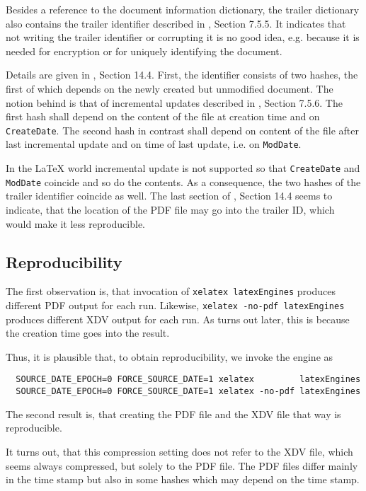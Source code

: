\documentclass[a4paper, english]{article}%
\begin{document}
Besides a reference to the document information dictionary, 
the trailer dictionary also contains the trailer identifier 
described in \cite{Pdf20}, Section 7.5.5. 
It indicates that not writing the trailer identifier or corrupting it is no good idea, 
e.g. because it is needed for encryption or for uniquely identifying the document. 

Details are given in \cite{Pdf20}, Section 14.4. 
First, the identifier consists of two hashes, 
the first of which depends on the newly created but unmodified document. 
The notion behind is that of incremental updates described in \cite{Pdf20}, Section 7.5.6. 
The first hash shall depend on the content of the file 
at creation time and on \texttt{CreateDate}. 
The second hash in contrast shall depend on content of the file after last incremental update 
and on time of last update, i.e. on \texttt{ModDate}. 

In the \LaTeX{} world incremental update is not supported 
so that \texttt{CreateDate} and \texttt{ModDate} coincide 
and so do the contents. 
As a consequence, the two hashes of the trailer identifier coincide as well. 
The last section of \cite{Pdf20}, Section 14.4 seems to indicate, 
that the location of the PDF file may go into the trailer ID, 
which would make it less reproducible. 


\subsection{Reproducibility}\label{subsec:reprod}

The first observation is, that invocation of \texttt{xelatex latexEngines} 
produces different PDF output for each run. 
Likewise, \texttt{xelatex -no-pdf latexEngines} produces different XDV output for each run. 
As turns out later, this is because the creation time goes into the result. 

Thus, it is plausible that, to obtain reproducibility, we invoke the engine as 
%
\begin{verbatim}
  SOURCE_DATE_EPOCH=0 FORCE_SOURCE_DATE=1 xelatex         latexEngines
  SOURCE_DATE_EPOCH=0 FORCE_SOURCE_DATE=1 xelatex -no-pdf latexEngines
\end{verbatim}

The second result is, that creating the PDF file and the XDV file that way is reproducible. 




It turns out, that this compression setting does not refer to the XDV file, 
which seems always compressed, but solely to the PDF file. 
The PDF files differ mainly in the time stamp 
but also in some hashes which may depend on the time stamp. 
\end{document}
